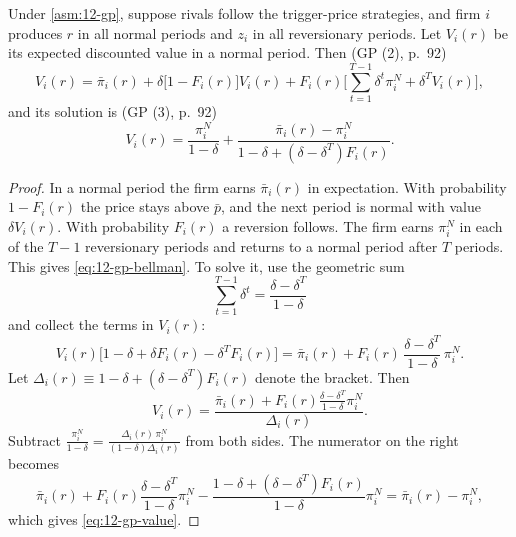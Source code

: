 \begin{proposition}\label{prop:12-gp-value}
Under \cref{asm:12-gp}, suppose rivals follow the trigger-price strategies, and firm $i$ produces $r$ in all normal
periods and $z_i$ in all reversionary periods. Let $V_i(r)$ be its expected discounted value in a normal period. Then
(GP (2), p.~92)
\begin{equation}\label{eq:12-gp-bellman}
V_i(r) = \bar\pi_i(r) + \delta\bigl[1 - F_i(r)\bigr]V_i(r) + F_i(r)\Biggl[\sum_{t=1}^{T-1}\delta^t\pi_i^N + \delta^T V_i(r)\Biggr],
\end{equation}
and its solution is (GP (3), p.~92)
\begin{equation}\label{eq:12-gp-value}
V_i(r) = \frac{\pi_i^N}{1 - \delta} + \frac{\bar\pi_i(r) - \pi_i^N}{1 - \delta + (\delta - \delta^T)F_i(r)} .
\end{equation}
\end{proposition}

\begin{proof}
In a normal period the firm earns $\bar\pi_i(r)$ in expectation. With probability $1 - F_i(r)$ the price stays above
$\bar p$, and the next period is normal with value $\delta V_i(r)$. With probability $F_i(r)$ a reversion follows. The
firm earns $\pi_i^N$ in each of the $T - 1$ reversionary periods and returns to a normal period after $T$ periods.
This gives \eqref{eq:12-gp-bellman}. To solve it, use the geometric sum
\begin{equation*}
\sum_{t=1}^{T-1}\delta^t = \frac{\delta - \delta^T}{1 - \delta}
\end{equation*}
and collect the terms in $V_i(r)$:
\begin{equation*}
V_i(r)\bigl[1 - \delta + \delta F_i(r) - \delta^T F_i(r)\bigr] = \bar\pi_i(r) + F_i(r)\,\frac{\delta - \delta^T}{1 - \delta}\,\pi_i^N .
\end{equation*}
Let $\Delta_i(r) \equiv 1 - \delta + (\delta - \delta^T)F_i(r)$ denote the bracket. Then
\begin{equation*}
V_i(r) = \frac{\bar\pi_i(r) + F_i(r)\frac{\delta - \delta^T}{1 - \delta}\pi_i^N}{\Delta_i(r)} .
\end{equation*}
Subtract $\frac{\pi_i^N}{1 - \delta} = \frac{\Delta_i(r)\,\pi_i^N}{(1 - \delta)\Delta_i(r)}$ from both sides. The
numerator on the right becomes
\begin{equation*}
\bar\pi_i(r) + F_i(r)\frac{\delta - \delta^T}{1 - \delta}\pi_i^N - \frac{1 - \delta + (\delta - \delta^T)F_i(r)}{1 - \delta}\pi_i^N
= \bar\pi_i(r) - \pi_i^N ,
\end{equation*}
which gives \eqref{eq:12-gp-value}.
\end{proof}

